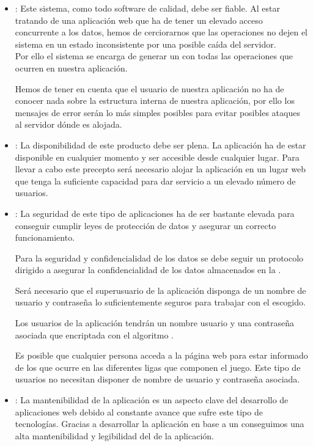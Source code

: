 \begin{itemize}
\item {}: Este sistema, como todo software de calidad, debe
  ser fiable. Al estar tratando de una aplicación web que ha de tener un elevado
  acceso concurrente a los datos, hemos de cerciorarnos que las operaciones no
  dejen el sistema en un
  estado inconsistente por una posible caída del servidor.\\

  Por ello el sistema se encarga de generar un  con todas las
  operaciones que ocurren en nuestra aplicación.

  Hemos de tener en cuenta que el usuario de nuestra aplicación no ha de conocer
  nada sobre la estructura interna de nuestra aplicación, por ello los mensajes
  de error serán lo más simples posibles para evitar posibles ataques al
  servidor dónde es alojada.

\item {}: La disponibilidad de este producto debe ser
  plena. La aplicación ha de estar disponible en cualquier momento y ser
  accesible desde cualquier lugar. Para llevar a cabo este precepto será
  necesario alojar la aplicación en un lugar web que tenga la suficiente
  capacidad para dar servicio a un elevado número de usuarios.

\item {}: La seguridad de este tipo de aplicaciones ha de ser
  bastante elevada para conseguir cumplir leyes de protección de datos y
  asegurar un correcto funcionamiento.

  Para la seguridad y confidencialidad de los datos se debe seguir un protocolo
  dirigido a asegurar la confidencialidad de los datos almacenados en la
  .

  Será necesario que el superusuario de la aplicación disponga de un nombre de
  usuario y contraseña lo suficientemente seguros para trabajar con el
   escogido.

  Los usuarios de la aplicación tendrán un nombre usuario y una contraseña
  asociada que encriptada con el algoritmo .

  Es posible que cualquier persona acceda a la página web para estar informado
  de los que ocurre en las diferentes ligas que componen el juego. Este tipo de
  usuarios no necesitan disponer de nombre de usuario y contraseña asociada.

\item {}: La mantenibilidad de la aplicación es un aspecto
  clave del desarrollo de aplicaciones web debido al constante avance que sufre
  este tipo de tecnologías. Gracias a desarrollar la aplicación en base a un
   conseguimos una alta
  mantenibilidad y legibilidad del  de la aplicación.


\end{itemize}
